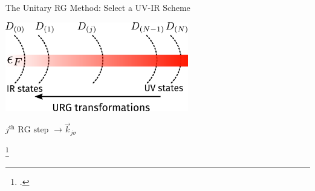 \documentclass[11pt,aspectratio=169]{beamer}
\begin{document}
\begin{frame}{The Unitary RG Method: Select a UV-IR Scheme}

\includegraphics[width=0.6\textwidth]{figures/urg-scheme.pdf}

\vspace*{\fill}
{\Large \( j^\text{th} \text{ RG step } \longrightarrow \vec k_{j\sigma}\)}

\footcite{anirbanurg1,anirbanurg2}

\end{frame}
\end{document}

